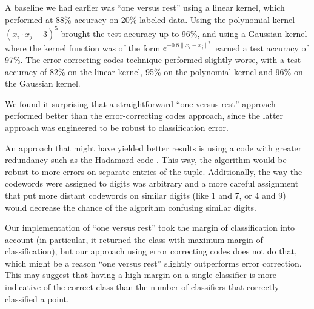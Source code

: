 \documentclass[11pt]{article}
\begin{document}
A baseline we had earlier was ``one versus rest'' using a linear kernel,
which performed at 88\% accuracy on 20\% labeled data. Using the polynomial
kernel $(x_i\cdot x_j + 3)^5$
brought the test accuracy up to 96\%, and using a Gaussian kernel
where the kernel function was of the form $e^{-0.8\|x_i-x_j\|^2}$
earned a test accuracy of 97\%. The error correcting codes technique
performed slightly worse, with a test accuracy of 82\% on the linear kernel,
95\% on the polynomial kernel and 96\% on the Gaussian kernel.

We found it surprising that a straightforward ``one versus rest''
approach performed better than the error-correcting codes approach,
since the latter approach was engineered to be robust to classification
error.

An approach that might have yielded better results is
using a code with greater redundancy such as the Hadamard
code \cite{macwilliams1977theory}.
This way, the algorithm would be robust to more errors on separate entries
of the tuple.
Additionally, the way the codewords were assigned to digits was arbitrary
and a more careful assignment that put more distant codewords on
similar digits (like 1 and 7, or 4 and 9) would decrease the chance
of the algorithm confusing similar digits.

Our implementation of ``one versus rest'' took the margin of classification
into account (in particular, it returned the class with maximum margin of
classification), but our approach using error correcting codes does not do that,
which might be a reason ``one versus rest'' slightly 
outperforms error correction. This may suggest that having a high margin
on a single classifier is more indicative of the correct class than
the number of classifiers that correctly classified a point.
\end{document}
